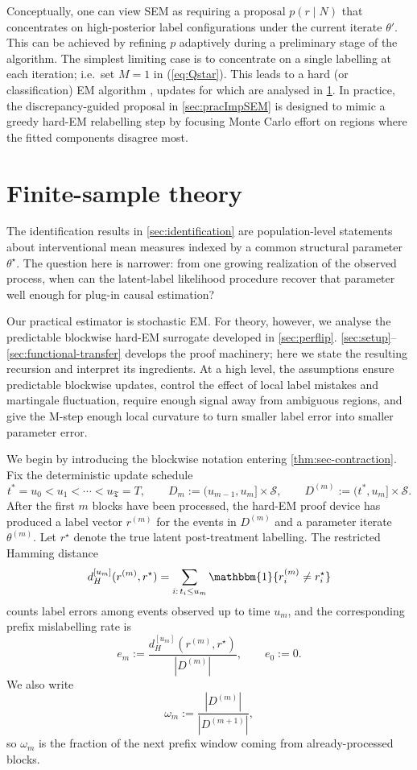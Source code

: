\documentclass{statsoc}
\newcommand{\1}{\mathbbm{1}}
\newcommand{\Tmax}{\mathfrak{T}}
\begin{document}
Conceptually, one can view SEM as requiring a proposal \(p(r\mid N)\) that concentrates on high-posterior label configurations under the current iterate \(\theta'\). This can be achieved by refining \(p\) adaptively during a preliminary stage of the algorithm. The simplest limiting case is to concentrate on a single labelling at each iteration; i.e.\ set $M=1$ in (\ref{eq:Qstar}). This leads to a hard (or classification) EM algorithm \citep{celeux1992classification}, updates for which are analysed in \cref{sec:finite-sample-theory}. In practice, the discrepancy-guided proposal in \cref{sec:pracImpSEM} is designed to mimic a greedy hard-EM relabelling step by focusing Monte Carlo effort on regions where the fitted components disagree most. 





\section{Finite-sample theory}\label{sec:finite-sample-theory}

The identification results in \cref{sec:identification} are population-level statements about interventional mean measures indexed by a common structural parameter \(\theta^\star\). The question here is narrower: from one growing realization of the observed process, when can the latent-label likelihood procedure recover that parameter well enough for plug-in causal estimation?

Our practical estimator is stochastic EM. For theory, however, we analyse the predictable blockwise hard-EM surrogate developed in \cref{sec:perflip}. \cref{sec:setup}--\cref{sec:functional-transfer} develops the proof machinery; here we state the resulting recursion and interpret its ingredients. At a high level, the assumptions ensure predictable blockwise updates, control the effect of local label mistakes and martingale fluctuation, require enough signal away from ambiguous regions, and give the M-step enough local curvature to turn smaller label error into smaller parameter error.

We begin by introducing the blockwise notation entering \cref{thm:sec-contraction}.  Fix the deterministic update schedule
\[
t^\ast=u_0<u_1<\cdots<u_{\Tmax}=T,
\qquad
D_m:=(u_{m-1},u_m]\times\mathcal S,
\qquad
D^{(m)}:=(t^\ast,u_m]\times\mathcal S.
\]
After the first \(m\) blocks have been processed, the hard-EM proof device has produced a label vector \(r^{(m)}\) for the events in \(D^{(m)}\) and a parameter iterate \(\theta^{(m)}\). Let \(r^\star\) denote the true latent post-treatment labelling. The restricted Hamming distance
\[
d_H^{[u_m]}(r^{(m)},r^\star)
=
\sum_{i:\,t_i\le u_m}\1\{r_i^{(m)}\neq r_i^\star\}
\]
counts label errors among events observed up to time \(u_m\), and the corresponding prefix mislabelling rate is
\[
e_m:=\frac{d_H^{[u_m]}(r^{(m)},r^\star)}{|D^{(m)}|},
\qquad e_0:=0.
\]
We also write
\[
\omega_m:=\frac{|D^{(m)}|}{|D^{(m+1)}|},
\]
so \(\omega_m\) is the fraction of the next prefix window coming from already-processed blocks.
\end{document}
